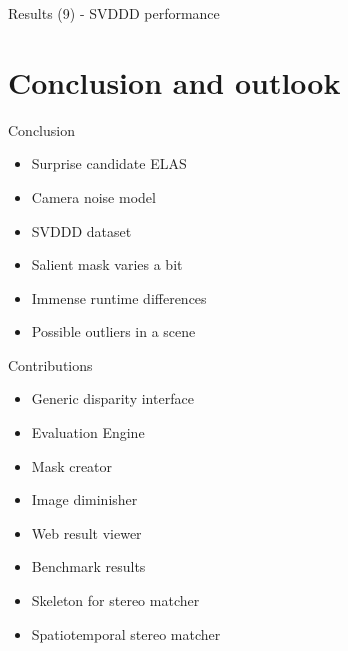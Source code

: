 \documentclass[10pt]{beamer}
\begin{document}
\begin{frame}[fragile]{Results (9) - SVDDD performance}
  \begin{table}
  \centering
  \caption{Result table for general performance of SVDDD (PBMP$_{noc,1px}$)}
  \end{table}
\end{frame}

\section{Conclusion and outlook}

\begin{frame}[fragile]{Conclusion}
  \begin{itemize}
    \item Surprise candidate ELAS
    \item Camera noise model
    \item SVDDD dataset
    \item Salient mask varies a bit
    \item Immense runtime differences
    \item Possible outliers in a scene
  \end{itemize}
\end{frame}

\begin{frame}[fragile]{Contributions}
  \begin{itemize}
    \item Generic disparity interface
    \item Evaluation Engine
    \item Mask creator
    \item Image diminisher
    \item Web result viewer
    \item Benchmark results
    \item Skeleton for stereo matcher
    \item Spatiotemporal stereo matcher
  \end{itemize}
\end{frame}
\end{document}
